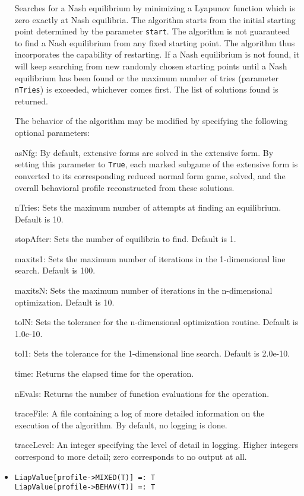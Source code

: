 \begin{itemize}
\bd 
Searches for a Nash equilibrium by minimizing a Lyapunov function
which is zero exactly at Nash equilibria.  The algorithm starts from
the initial starting point determined by the parameter \verb+start+.
The algorithm is not guaranteed to find a Nash equilibrium from any
fixed starting point.  The algorithm thus incorporates the capability
of restarting.  If a Nash equilibrium is not found, it will keep
searching from new randomly chosen starting points until a Nash
equilibrium has been found or the maximum number of tries (parameter
\verb+nTries+) is exceeded, whichever comes first.  The list of
solutions found is returned.

The behavior of the algorithm may be modified by specifying the following
optional parameters:
\bd
\item
[asNfg:] By default, extensive forms are solved in the extensive form.
By setting this parameter to \verb+True+, each marked subgame of the
extensive form is converted to its corresponding reduced normal form game,
solved, and the overall behavioral profile reconstructed from these
solutions.
\item
[nTries:] Sets the maximum number of attempts at finding an
equilibrium. Default is 10.
\item
[stopAfter:] Sets the number of equilibria to find.  Default is 1.
\item
[maxits1:] Sets the maximum number of iterations in the
1-dimensional line search.  Default is 100.
\item
[maxitsN:] Sets the maximum number of iterations in the
n-dimensional optimization.  Default is 10.
\item
[tolN:] Sets the tolerance for the n-dimensional optimization
routine.  Default is 1.0e-10.
\item
[tol1:] Sets the tolerance for the 1-dimensional line search.
Default is 2.0e-10.
\item
[time:] Returns the elapsed time for the operation.
\item
[nEvals:] Returns the number of function evaluations for the operation.
\item
[traceFile:] A file containing a log of more detailed information on the
execution of the algorithm.  By default, no logging is done.
\item
[traceLevel:] An integer specifying the level of detail in logging.
Higher integers correspond to more detail; zero corresponds to no output
at all.
\ed
\ed

\item
\protect \large \begin{verbatim}
LiapValue[profile->MIXED(T)] =: T
LiapValue[profile->BEHAV(T)] =: T
\end{verbatim} \normalsize


\end{itemize}
